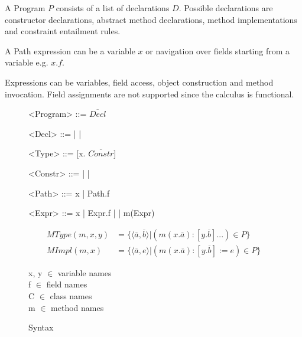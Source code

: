 A Program $P$ consists of a list of declarations $D$.
Possible declarations are constructor declarations,
abstract method declarations, method implementations and constraint entailment rules.

A Path expression can be a variable $x$ or navigation over fields starting from a variable e.g. $x.f$.

Expressions can be variables, field access, object construction and method invocation.
Field assignments are not supported since the calculus is functional.

\begin{figure}
\setlength{\grammarindent}{5em} %
\begin{grammar}
<Program>  ::= $\overline{Decl}$

<Decl> ::=  %
       | 
       \alt {} %
       |  %

<Type> ::= [x. $\overline{Constr}$]

<Constr> ::=  %
           |  %
           |  %

<Path> ::= x
       | Path.f

<Expr> ::= x
       | Expr.f
       |  %
       | m(Expr)
\end{grammar}

\begin{align*}
MType(m, x, y) &= \{ \langle\overline{a}, \overline{b}\rangle | (m(x. \overline{a}): [y. \overline{b}]...) \in P \} \\
MImpl(m, x) &= \{\langle\overline{a}, e\rangle | (m(x. \overline{a}): [y. \overline{b}] := e) \in P \}
\end{align*}

x, y $\in$ variable names\\
f $\in$ field names\\
C $\in$ class names\\
m $\in$ method names
\caption{Syntax}
\label{fig:dcc-syntax}
\end{figure}

